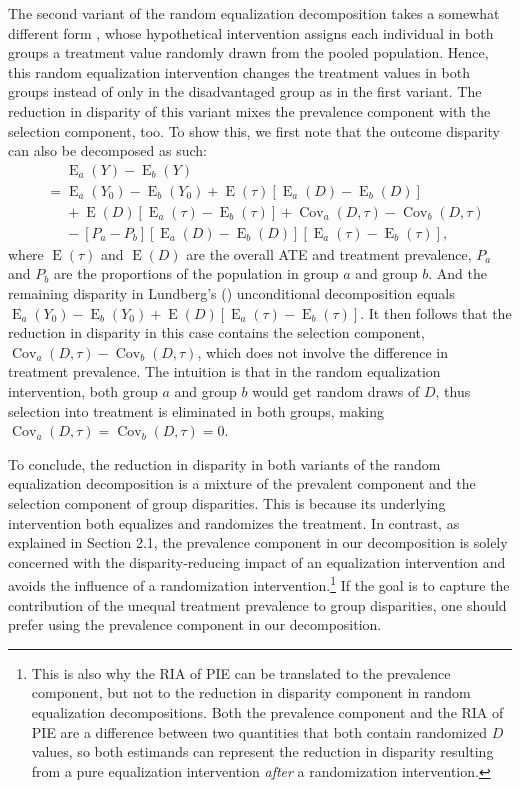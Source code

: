 \documentclass[12pt,a4paper]{article}
\newcommand{\Cov}{\operatorname{Cov}}
\newcommand{\E}{\operatorname{E}}
\begin{document}
The second variant of the random equalization decomposition takes a somewhat different form \citep{lundberg_gap-closing_2022}, whose hypothetical intervention assigns each individual in both groups a treatment value randomly drawn from the pooled population. Hence, this random equalization intervention changes the treatment values in both groups instead of only in the disadvantaged group as in the first variant. The reduction in disparity of this variant  mixes the prevalence component with the selection component, too. To show this, we first note that the outcome disparity can also be decomposed as such: 
\begin{align*}
&\phantom{{}={}} \E_a(Y)-\E_b(Y) \\
&= \E_a(Y_{0})-\E_b(Y_{0}) + \E(\tau)[\E_a(D)-\E_b(D)] \\
&\phantom{{}={}} + \E(D)[ \E_a(\tau) - \E_b(\tau)] + \Cov_a(D, \tau) - \Cov_b(D, \tau) \\
&\phantom{{}={}} - [P_a-P_b][\E_a(D) - \E_b(D)][\E_a(\tau)-\E_b(\tau)], 
\end{align*} 
where $\E(\tau)$ and $\E(D)$ are the overall ATE and treatment prevalence, $P_a$ and $P_b$ are the proportions of the population in group $a$ and group $b$.
And the remaining disparity in Lundberg's (\citeyear{lundberg_gap-closing_2022}) unconditional decomposition equals 
$\E_a(Y_{0})-\E_b(Y_{0}) + \E(D)[ \E_a(\tau) - \E_b(\tau)] \nonumber$. It then follows that the reduction in disparity in this case contains the selection component, $\Cov_a(D, \tau) -  \Cov_b(D, \tau)$, which does not involve the difference in treatment prevalence. The intuition is that in the random equalization intervention, both group $a$ and group $b$ would get random draws of $D$, thus  selection into treatment is eliminated in both groups, making $\Cov_a(D,\tau)=\Cov_b(D,\tau)=0$.

To conclude, the reduction in disparity in both variants of the random equalization decomposition is a mixture of the prevalent component and the selection component of group disparities. This is because its underlying intervention both equalizes and randomizes the treatment. In contrast, as explained in Section 2.1,  the prevalence component in our decomposition is solely concerned with the disparity-reducing impact of an equalization intervention and avoids the influence of a randomization intervention.\footnote{This is also why the RIA of PIE can be translated to the prevalence component, but not to the reduction in disparity component in random equalization decompositions. Both the prevalence component and the RIA of PIE are a difference between two quantities that both contain randomized $D$ values, so both estimands can represent the reduction in disparity resulting from a pure equalization intervention \emph{after} a randomization intervention.} If the goal is to capture the contribution of the unequal treatment prevalence to group disparities, one should prefer using the prevalence component in our decomposition.
 
\end{document}
